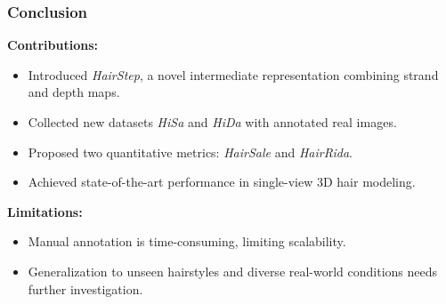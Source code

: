 
\begin{frame}[t]
    \frametitle{Conclusion}
    \textbf{Contributions:}
    \begin{itemize}
        \item Introduced \textit{HairStep}, a novel intermediate representation combining strand and depth maps.
        \item Collected new datasets \textit{HiSa} and \textit{HiDa} with annotated real images.
        \item Proposed two quantitative metrics: \textit{HairSale} and \textit{HairRida}.
        \item Achieved state-of-the-art performance in single-view 3D hair modeling.
    \end{itemize}
    \vspace{1em}
    \textbf{Limitations:}
    \begin{itemize}
        \item Manual annotation is time-consuming, limiting scalability.
        \item Generalization to unseen hairstyles and diverse real-world conditions needs further investigation.
    \end{itemize}
\end{frame}